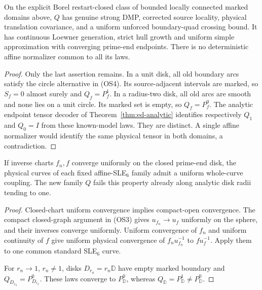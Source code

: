 \begin{theorem}
\label{thm:one-switch-lc-counterexample}
On the explicit Borel restart-closed class of bounded locally
connected marked domains above, $Q$ has genuine strong DMP,
corrected source locality, physical translation covariance, and a
uniform unforced boundary-quad crossing bound. It has continuous
Loewner generation, strict hull growth and uniform simple
approximation with converging prime-end endpoints.
There is no deterministic affine normalizer common to all its laws.
\end{theorem}
\begin{proof}
Only the last assertion remains. In a unit disk, all old boundary
arcs satisfy the circle alternative in (OS4). Its source-adjacent
intervals are marked, so $S_f=0$ almost surely and $Q_f=P^1_f$.
In a radius-two disk, all old arcs are smooth and none lies on
a unit circle. Its marked set is empty, so $Q_f=P^0_f$.
The analytic endpoint tensor decoder of
Theorem~\ref{thm:ed-analytic} identifies respectively $Q_1$ and
$Q_0=I$ from these known-model laws. They are distinct.
A single affine normalizer would identify the same physical
tensor in both domains, a contradiction.
\end{proof}

\begin{proposition}
\label{prop:affine-sle-closed-chart-continuity}
If inverse charts $f_n,f$ converge uniformly on the closed
prime-end disk, the physical curves of each fixed affine-SLE$_6$
family admit a uniform whole-curve coupling. The new family $Q$
fails this property already along analytic disk radii tending to one.
\end{proposition}
\begin{proof}
Closed-chart uniform convergence implies compact-open convergence.
The compact closed-graph argument in (OS3) gives $u_{f_n}\to u_f$
uniformly on the sphere, and their inverses converge uniformly.
Uniform convergence of $f_n$ and uniform continuity of $f$ give
uniform physical convergence of $f_n u_{f_n}^{-1}$ to
$f u_f^{-1}$. Apply them to one common standard SLE$_6$ curve.

For $r_n\to1$, $r_n\ne1$, disks $D_{r_n}=r_n\mathbb D$ have
empty marked boundary and $Q_{D_{r_n}}=P^0_{D_{r_n}}$.
These laws converge to $P^0_{\mathbb D}$, whereas
$Q_{\mathbb D}=P^1_{\mathbb D}\ne P^0_{\mathbb D}$.
\end{proof}


